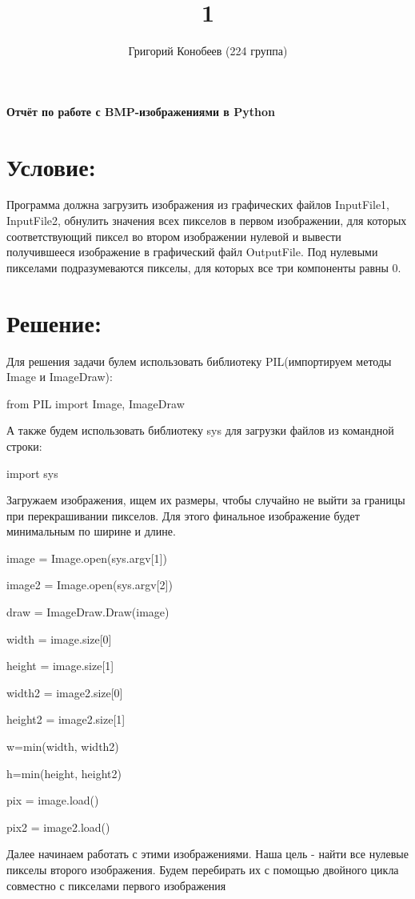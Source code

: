 \documentclass{article}
\author{Григорий Конобеев (224 группа)}
\title{1}
\begin{document}
\maketitle
\begin{center}
{\large\bf Отчёт по работе с BMP-изображениями в Python}
\end{center}

\section{Условие:} Программа должна загрузить изображения из графических файлов InputFile1, InputFile2, обнулить значения всех пикселов в первом изображении, для которых соответствующий пиксел во втором изображении нулевой и вывести получившееся изображение в графический файл OutputFile. Под нулевыми пикселами подразумеваются пикселы, для которых все три компоненты равны 0.


\section{Решение:}  Для решения задачи булем использовать библиотеку PIL(импортируем методы Image и ImageDraw):

\textsf{from PIL import Image, ImageDraw }

А также будем использовать библиотеку sys для загрузки файлов из командной строки:

\textsf{import sys}

Загружаем изображения, ищем их размеры, чтобы случайно не выйти за границы при перекрашивании пикселов. Для этого финальное изображение будет минимальным по ширине и длине.

{

image = Image.open(sys.argv[1])

image2 = Image.open(sys.argv[2])

draw = ImageDraw.Draw(image)

width = image.size[0]

height = image.size[1]

width2 = image2.size[0]

height2 = image2.size[1]

w=min(width, width2)

h=min(height, height2)

pix = image.load()

pix2 = image2.load() }


Далее начинаем работать с этими изображениями. Наша цель - найти все нулевые пикселы второго изображения. Будем перебирать их с помощью двойного цикла совместно с пикселами первого изображения
\end{document}
